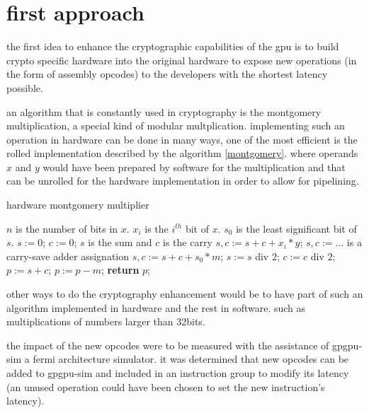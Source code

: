 \documentclass{report}
\begin{document}
\chapter{first approach}
    the first idea to enhance the cryptographic capabilities of the gpu is to
    build crypto specific hardware into the original hardware to expose new 
    operations (in the form of assembly opcodes) to the developers with the 
    shortest latency possible. 
    
    an algorithm that is constantly used in cryptography is the montgomery multiplication,
    a special kind of modular multplication. implementing such an operation in hardware can
    be done in many ways, one of the most efficient is the rolled implementation described
    by the algorithm \ref{montgomery}. where operands $x$ and $y$ would have been prepared
    by software for the multiplication and that can be unrolled for the hardware implementation
    in order to allow for pipelining.
    
    \begin{algorithm}
    \caption{hardware montgomery multiplier\cite{montgomeryhard}}\label{montgomery}
    \begin{algorithmic}[1]
        \statex $n$ is the number of bits in $x$.
        \statex $x_i$ is the $i^{th}$ bit of $x$.
        \statex $s_0$ is the least significant bit of $s$. 		
        \state $s := 0$; $c := 0$; \comment $s$ is the sum and $c$ is the carry
            \state $s,c := s + c + x_i * y$; \comment $s,c := ...$ is a carry-save adder assignation
            \state $s,c := s + c + s_0 * m$;
            \state $s := s$ div $2$; $c := c$ div $2$;  
        \endfor
        \state $p := s + c$;
            \state $p := p - m$;
        \endif
        \state \textbf{return} $p$;
    \end{algorithmic}
    \end{algorithm}
    
    other ways to do the cryptography enhancement would be to have part of such
    an algorithm implemented in hardware and the rest in software.
    such as multiplications of numbers larger than 32bits.
    

    the impact of the new opcodes were to be measured with the assistance of
    gpgpu-sim\cite{gpgpusim09} a fermi architecture simulator. it was determined
    that new opcodes can be added to gpgpu-sim and included in an instruction group
    to modify its latency (an unused operation could have been chosen to set the new
    instruction's latency).
\end{document}
